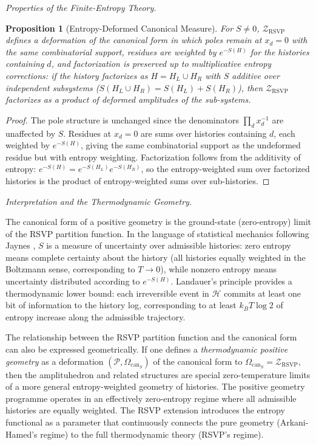 \documentclass[12pt, oneside]{amsart}
\theoremstyle{plain}
\newtheorem{proposition}[theorem]{Proposition}
\theoremstyle{definition}
\theoremstyle{remark}
\newcommand{\Sf}{S}
\newcommand{\HKS}{\mathcal{H}}
\newcommand{\CF}{\Omega_{\mathrm{can}}}
\newcommand{\ZRSVP}{\mathcal{Z}_{\mathrm{RSVP}}}
\begin{document}
\medskip\noindent\textit{Properties of the Finite-Entropy Theory.}

\begin{proposition}[Entropy-Deformed Canonical Measure]
For $\Sf \neq 0$, $\ZRSVP$ defines a deformation of the canonical form in which poles remain at $x_d = 0$ with the same combinatorial support, residues are weighted by $e^{-\Sf(H)}$ for the histories containing $d$, and factorization is preserved up to multiplicative entropy corrections: if the history factorizes as $H = H_L \cup H_R$ with $\Sf$ additive over independent subsystems ($\Sf(H_L \cup H_R) = \Sf(H_L) + \Sf(H_R)$), then $\ZRSVP$ factorizes as a product of deformed amplitudes of the sub-systems.
\end{proposition}

\begin{proof}
The pole structure is unchanged since the denominators $\prod_d x_d^{-1}$ are unaffected by $\Sf$. Residues at $x_d = 0$ are sums over histories containing $d$, each weighted by $e^{-\Sf(H)}$, giving the same combinatorial support as the undeformed residue but with entropy weighting. Factorization follows from the additivity of entropy: $e^{-\Sf(H)} = e^{-\Sf(H_L)} e^{-\Sf(H_R)}$, so the entropy-weighted sum over factorized histories is the product of entropy-weighted sums over sub-histories.
\end{proof}

\medskip\noindent\textit{Interpretation and the Thermodynamic Geometry.}

The canonical form of a positive geometry is the ground-state (zero-entropy) limit of the RSVP partition function. In the language of statistical mechanics following Jaynes \cite{Jaynes1957}, $\Sf$ is a measure of uncertainty over admissible histories: zero entropy means complete certainty about the history (all histories equally weighted in the Boltzmann sense, corresponding to $T \to 0$), while nonzero entropy means uncertainty distributed according to $e^{-\Sf(H)}$. Landauer's principle \cite{Landauer1961} provides a thermodynamic lower bound: each irreversible event in $\HKS$ commits at least one bit of information to the history log, corresponding to at least $k_B T \log 2$ of entropy increase along the admissible trajectory.

The relationship between the RSVP partition function and the canonical form can also be expressed geometrically. If one defines a \emph{thermodynamic positive geometry} as a deformation $(\mathcal{P}, \CF_{\Sf})$ of the canonical form to $\CF_{\Sf} = \ZRSVP$, then the amplituhedron and related structures are special zero-temperature limits of a more general entropy-weighted geometry of histories. The positive geometry programme operates in an effectively zero-entropy regime where all admissible histories are equally weighted. The RSVP extension introduces the entropy functional as a parameter that continuously connects the pure geometry (Arkani-Hamed's regime) to the full thermodynamic theory (RSVP's regime).
\end{document}

